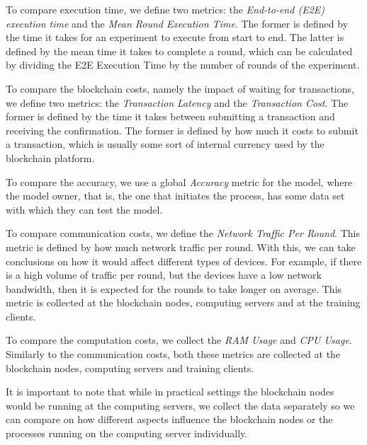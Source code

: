 To compare execution time, we define two metrics: the \textit{End-to-end (E2E) execution time} and the \textit{Mean Round Execution Time}. The former is defined by the time it takes for an experiment to execute from start to end. The latter is defined by the mean time it takes to complete a round, which can be calculated by dividing the E2E Execution Time by the number of rounds of the experiment.

To compare the blockchain costs, namely the impact of waiting for transactions, we define two metrics: the \textit{Transaction Latency} and the \textit{Transaction Cost}. The former is defined by the time it takes between submitting a transaction and receiving the confirmation. The former is defined by how much it costs to submit a transaction, which is usually some sort of internal currency used by the blockchain platform.

To compare the accuracy, we use a global \textit{Accuracy} metric for the model, where the model owner, that is, the one that initiates the process, has some data set with which they can test the model.

To compare communication costs, we define the \textit{Network Traffic Per Round}. This metric is defined by how much network traffic per round. With this, we can take conclusions on how it would affect different types of devices. For example, if there is a high volume of traffic per round, but the devices have a low network bandwidth, then it is expected for the rounds to take longer on average. This metric is collected at the blockchain nodes, computing servers and at the training clients.

To compare the computation costs, we collect the \textit{RAM Usage} and \textit{CPU Usage}. Similarly to the communication costs, both these metrics are collected at the blockchain nodes, computing servers and training clients.

It is important to note that while in practical settings the blockchain nodes would be running at the computing servers, we collect the data separately so we can compare on how different aspects influence the blockchain nodes or the processes running on the computing server individually.
